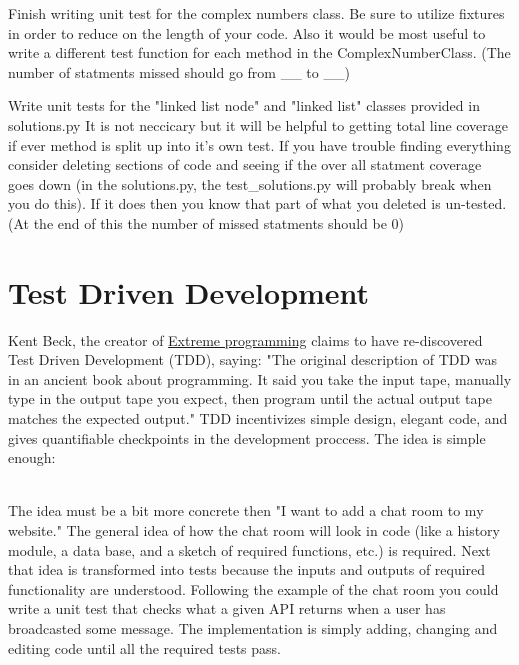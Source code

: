\begin{problem}
Finish writing unit test for the complex numbers class. Be sure to utilize fixtures in order to reduce on the length of your code.
Also it would be most useful to write a different test function for each method in the ComplexNumberClass.
(The number of statments missed should go from \_\_ to \_\_)
\end{problem}

\begin{problem}
Write unit tests for the "linked list node" and "linked list" classes provided in solutions.py It is not neccicary but it will be helpful to getting total line coverage if ever method is split up into it's own test.
If you have trouble finding everything consider deleting sections of code and seeing if the over all statment coverage goes down (in the solutions.py, the test\_solutions.py will probably break when you do this).
If it does then you know that part of what you deleted is un-tested.
(At the end of this the number of missed statments should be 0)
\end{problem}

\section*{Test Driven Development}

Kent Beck, the creator of \href{https://en.wikipedia.org/wiki/Extreme_programming}{Extreme programming} claims to have re-discovered  Test Driven Development (TDD), saying:
"The original description of TDD was in an ancient book about programming. It said you take the input tape, manually type in the output tape you expect, then program until the actual output tape matches the expected output."
TDD incentivizes simple design, elegant code, and gives quantifiable checkpoints in the development proccess.
The idea is simple enough:
\\
The idea must be a bit more concrete then "I want to add a chat room to my website." The general idea of how the chat room will look in code (like a history module, a data base, and a sketch of required functions, etc.) is required.
Next that idea is transformed into tests because the inputs and outputs of required functionality are understood.
Following the example of the chat room you could write a unit test that checks what a given API returns when a user has broadcasted some message.
The implementation is simply adding, changing and editing code until all the required tests pass.

